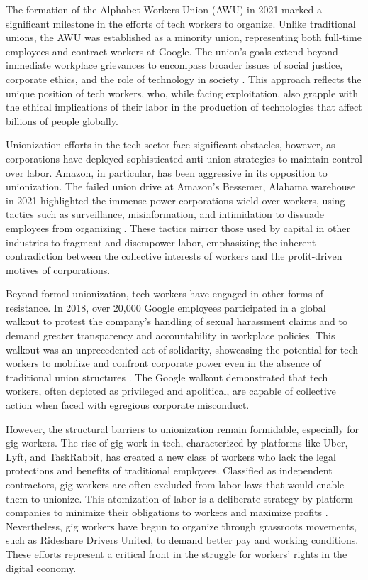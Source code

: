 The formation of the Alphabet Workers Union (AWU) in 2021 marked a significant milestone in the efforts of tech workers to organize. Unlike traditional unions, the AWU was established as a minority union, representing both full-time employees and contract workers at Google. The union’s goals extend beyond immediate workplace grievances to encompass broader issues of social justice, corporate ethics, and the role of technology in society \cite[pp.~92-94]{turner2021}. This approach reflects the unique position of tech workers, who, while facing exploitation, also grapple with the ethical implications of their labor in the production of technologies that affect billions of people globally.

Unionization efforts in the tech sector face significant obstacles, however, as corporations have deployed sophisticated anti-union strategies to maintain control over labor. Amazon, in particular, has been aggressive in its opposition to unionization. The failed union drive at Amazon’s Bessemer, Alabama warehouse in 2021 highlighted the immense power corporations wield over workers, using tactics such as surveillance, misinformation, and intimidation to dissuade employees from organizing \cite[pp.~14-16]{sainato2021}. These tactics mirror those used by capital in other industries to fragment and disempower labor, emphasizing the inherent contradiction between the collective interests of workers and the profit-driven motives of corporations.

Beyond formal unionization, tech workers have engaged in other forms of resistance. In 2018, over 20,000 Google employees participated in a global walkout to protest the company’s handling of sexual harassment claims and to demand greater transparency and accountability in workplace policies. This walkout was an unprecedented act of solidarity, showcasing the potential for tech workers to mobilize and confront corporate power even in the absence of traditional union structures \cite[pp.~32-34]{tarnoff2019}. The Google walkout demonstrated that tech workers, often depicted as privileged and apolitical, are capable of collective action when faced with egregious corporate misconduct.

However, the structural barriers to unionization remain formidable, especially for gig workers. The rise of gig work in tech, characterized by platforms like Uber, Lyft, and TaskRabbit, has created a new class of workers who lack the legal protections and benefits of traditional employees. Classified as independent contractors, gig workers are often excluded from labor laws that would enable them to unionize. This atomization of labor is a deliberate strategy by platform companies to minimize their obligations to workers and maximize profits \cite[pp.~45-47]{ravenelle2019}. Nevertheless, gig workers have begun to organize through grassroots movements, such as Rideshare Drivers United, to demand better pay and working conditions. These efforts represent a critical front in the struggle for workers’ rights in the digital economy.


